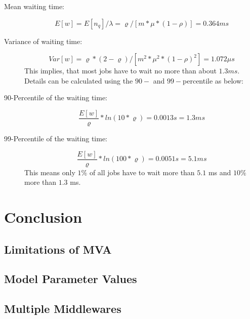 \documentclass[a4paper, oneside]{csthesis}
\begin{document}
\begin{description}
\item[Mean waiting time:]
\[
E[w] = E[n_q]/\lambda = \varrho / [m * \mu * (1 - \rho)] = 0.364 ms
\]

\item[Variance of waiting time:]
\[
Var[w] = \varrho * (2 - \varrho)/[m^2 * \mu^2 * (1 - \rho)^2] = 1.072 \mu s
\]
This implies, that most jobs have to wait no more than about $1.3 ms$. Details
can be calculated using the $90-$ and $99-$percentile as below:

\item[90-Percentile of the waiting time:]
\[
\frac{E[w]}{\varrho} * ln(10 * \varrho) = 0.0013 s = 1.3 ms
\]

\item[99-Percentile of the waiting time:]
\[
\frac{E[w]}{\varrho} * ln(100 * \varrho) = 0.0051 s = 5.1 ms
\]
This means only $1 \%$ of all jobs have to wait more than $5.1$ ms and $10 \%$
more than $1.3$ ms.

\end{description}



\chapter{Conclusion}
	\label{ch:conclusion}
	
\section{Limitations of MVA}

\section{Model Parameter Values}
	
\section{Multiple Middlewares}






	
\end{document}
